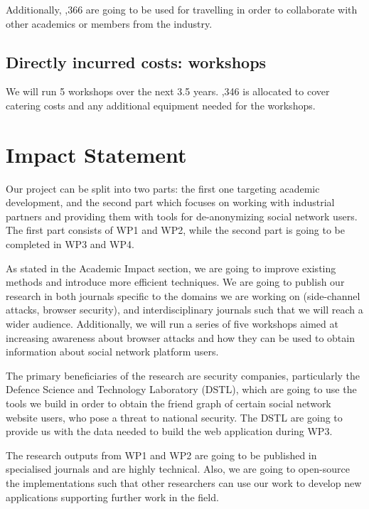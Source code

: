 \documentclass[a4paper,11pt]{article}
\begin{document}
Additionally, ,366 are going to be used for travelling in order to collaborate with other academics or members from the industry.

\subsection*{Directly incurred costs: workshops}
We will run 5 workshops over the next 3.5 years. ,346 is allocated to cover catering costs and any additional equipment needed for the workshops.
 

\newpage
\section*{Impact Statement}

%
Our project can be split into two parts: the first one targeting academic development, and the second part which focuses on working with industrial partners and providing them with tools for de-anonymizing social network users. The first part consists of WP1 and WP2, while the second part is going to be completed in WP3 and WP4.

As stated in the Academic Impact section, we are going to improve existing methods and introduce more efficient techniques. We are going to publish our research in both journals specific to the domains we are working on (side-channel attacks, browser security), and interdisciplinary journals such that we will reach a wider audience. Additionally, we will run a series of five workshops aimed at increasing awareness about browser attacks and how they can be used to obtain information about social network platform users.

The primary beneficiaries of the research are security companies, particularly the Defence Science and Technology Laboratory (DSTL), which are going to use the tools we build in order to obtain the friend graph of certain social network website users, who pose a threat to national security. The DSTL are going to provide us with the data needed to build the web application during WP3.

The research outputs from WP1 and WP2 are going to be published in specialised journals and are highly technical. Also, we are going to open-source the implementations such that other researchers can use our work to develop new applications supporting further work in the field.
\end{document}
